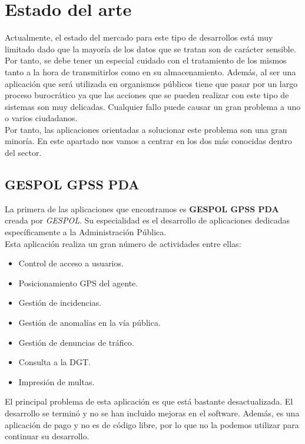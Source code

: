 \chapter{Estado del arte}

Actualmente, el estado del mercado para este tipo de desarrollos está muy limitado dado que 
la mayoría de los datos que se tratan son de carácter sensible. Por tanto, se 
debe tener un especial cuidado con el tratamiento de los mismos tanto a la hora de transmitirlos
como en su almacenamiento. Además, al ser una aplicación que será utilizada en organismos públicos 
tiene que pasar por un largo proceso burocrático ya que las acciones que se pueden realizar con este
tipo de sistemas son muy delicadas. Cualquier fallo puede causar un gran problema a uno o varios ciudadanos.\\

Por tanto, las aplicaciones orientadas a solucionar este problema son una gran minoría. En este apartado nos vamos
a centrar en los dos más conocidas dentro del sector.

\section{GESPOL GPSS PDA}
La primera de las aplicaciones que encontramos es \textbf{GESPOL GPSS PDA}\cite{gespol} creada por \textit{GESPOL}. Su especialidad es el desarrollo de 
aplicaciones dedicadas específicamente a la Administración Pública.\\

Esta aplicación realiza un gran número de actividades entre ellas:

\begin{itemize}
	\item Control de acceso a usuarios.
	\item Posicionamiento GPS del agente.
	\item Gestión de incidencias.
	\item Gestión de anomalías en la vía pública.
	\item Gestión de denuncias de tráfico.
	\item Consulta a la DGT.
	\item Impresión de multas.
\end{itemize}

El principal problema de esta aplicación es que está bastante desactualizada. El desarrollo se terminó y no se han incluido mejoras en el software. Además,
es una aplicación de pago y no es de código libre, por lo que no la podemos utilizar para continuar su desarrollo.

